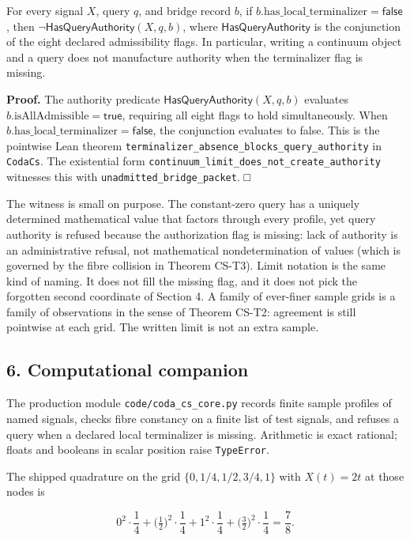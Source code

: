\documentclass[
  11pt,
]{article}
\begin{document}
For every signal \(X\), query \(q\), and bridge record \(b\), if \(b.\mathrm{has\_local\_terminalizer} = \mathsf{false}\), then \(\neg\mathsf{HasQueryAuthority}(X, q, b)\), where \(\mathsf{HasQueryAuthority}\) is the conjunction of the eight declared admissibility flags. In particular, writing a continuum object and a query does not manufacture authority when the terminalizer flag is missing.

\textbf{Proof.} The authority predicate \(\mathsf{HasQueryAuthority}(X, q, b)\) evaluates \(b.\mathrm{isAllAdmissible} = \mathsf{true}\), requiring all eight flags to hold simultaneously. When \(b.\mathrm{has\_local\_terminalizer} = \mathsf{false}\), the conjunction evaluates to false. This is the pointwise Lean theorem \nolinkurl{terminalizer_absence_blocks_query_authority} in \texttt{CodaCs}. The existential form \nolinkurl{continuum_limit_does_not_create_authority} witnesses this with \nolinkurl{unadmitted_bridge_packet}. □

The witness is small on purpose. The constant-zero query has a uniquely determined mathematical value that factors through every profile, yet query authority is refused because the authorization flag is missing: lack of authority is an administrative refusal, not mathematical nondetermination of values (which is governed by the fibre collision in Theorem CS-T3). Limit notation is the same kind of naming. It does not fill the missing flag, and it does not pick the forgotten second coordinate of Section 4. A family of ever-finer sample grids is a family of observations in the sense of Theorem CS-T2: agreement is still pointwise at each grid. The written limit is not an extra sample.

\subsection{6. Computational companion}\label{computational-companion}

The production module \nolinkurl{code/coda_cs_core.py} records finite sample profiles of named signals, checks fibre constancy on a finite list of test signals, and refuses a query when a declared local terminalizer is missing. Arithmetic is exact rational; floats and booleans in scalar position raise \texttt{TypeError}.

The shipped quadrature on the grid \(\{0,1/4,1/2,3/4,1\}\) with \(X(t)=2t\) at those nodes is

\[
0^2\cdot\frac14
+
\bigl(\tfrac12\bigr)^2\cdot\frac14
+
1^2\cdot\frac14
+
\bigl(\tfrac32\bigr)^2\cdot\frac14
=
\frac{7}{8}.
\]
\end{document}
